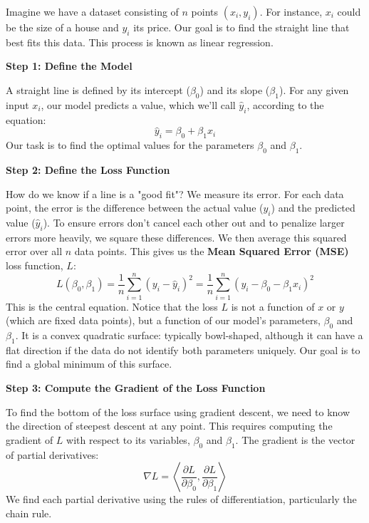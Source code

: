 \begin{solution}
Imagine we have a dataset consisting of \(n\) points \((x_i, y_i)\). For instance, \(x_i\) could be the size of a house and \(y_i\) its price. Our goal is to find the straight line that best fits this data. This process is known as linear regression.

\vspace{1em}
\textbf{Step 1: Define the Model}

A straight line is defined by its intercept (\(\beta_0\)) and its slope (\(\beta_1\)). For any given input \(x_i\), our model predicts a value, which we'll call \(\hat{y}_i\), according to the equation:
\[
\hat{y}_i = \beta_0 + \beta_1 x_i
\]
Our task is to find the optimal values for the parameters \(\beta_0\) and \(\beta_1\).

\vspace{1em}
\textbf{Step 2: Define the Loss Function}

How do we know if a line is a "good fit"? We measure its error. For each data point, the error is the difference between the actual value (\(y_i\)) and the predicted value (\(\hat{y}_i\)). To ensure errors don't cancel each other out and to penalize larger errors more heavily, we square these differences. We then average this squared error over all \(n\) data points. This gives us the \textbf{Mean Squared Error (MSE)} loss function, \(L\):
\[
L(\beta_0, \beta_1) = \frac{1}{n} \sum_{i=1}^{n} (y_i - \hat{y}_i)^2 = \frac{1}{n} \sum_{i=1}^{n} (y_i - \beta_0 - \beta_1 x_i)^2
\]
This is the central equation. Notice that the loss \(L\) is not a function of \(x\) or \(y\) (which are fixed data points), but a function of our model's parameters, \(\beta_0\) and \(\beta_1\). It is a convex quadratic surface: typically bowl-shaped, although it can have a flat direction if the data do not identify both parameters uniquely. Our goal is to find a global minimum of this surface.

\vspace{1em}
\textbf{Step 3: Compute the Gradient of the Loss Function}

To find the bottom of the loss surface using gradient descent, we need to know the direction of steepest descent at any point. This requires computing the gradient of \(L\) with respect to its variables, \(\beta_0\) and \(\beta_1\). The gradient is the vector of partial derivatives:
\[
\nabla L = \left\langle \frac{\partial L}{\partial \beta_0}, \frac{\partial L}{\partial \beta_1} \right\rangle
\]
We find each partial derivative using the rules of differentiation, particularly the chain rule.


\end{solution}
